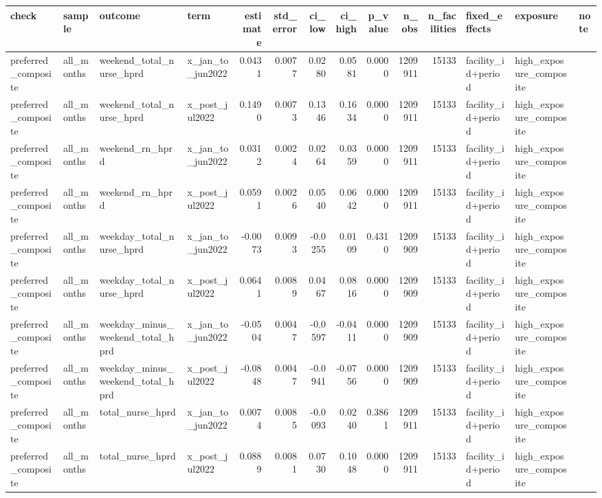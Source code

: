 \begin{tabular}{llllrrrrrrrlll}
\toprule
check & sample & outcome & term & estimate & std_error & ci_low & ci_high & p_value & n_obs & n_facilities & fixed_effects & exposure & note \\
\midrule
preferred_composite & all_months & weekend_total_nurse_hprd & x_jan_to_jun2022 & 0.0431 & 0.0077 & 0.0280 & 0.0581 & 0.0000 & 1209911 & 15133 & facility_id+period & high_exposure_composite &  \\
preferred_composite & all_months & weekend_total_nurse_hprd & x_post_jul2022 & 0.1490 & 0.0073 & 0.1346 & 0.1634 & 0.0000 & 1209911 & 15133 & facility_id+period & high_exposure_composite &  \\
preferred_composite & all_months & weekend_rn_hprd & x_jan_to_jun2022 & 0.0312 & 0.0024 & 0.0264 & 0.0359 & 0.0000 & 1209911 & 15133 & facility_id+period & high_exposure_composite &  \\
preferred_composite & all_months & weekend_rn_hprd & x_post_jul2022 & 0.0591 & 0.0026 & 0.0540 & 0.0642 & 0.0000 & 1209911 & 15133 & facility_id+period & high_exposure_composite &  \\
preferred_composite & all_months & weekday_total_nurse_hprd & x_jan_to_jun2022 & -0.0073 & 0.0093 & -0.0255 & 0.0109 & 0.4310 & 1209909 & 15133 & facility_id+period & high_exposure_composite &  \\
preferred_composite & all_months & weekday_total_nurse_hprd & x_post_jul2022 & 0.0641 & 0.0089 & 0.0467 & 0.0816 & 0.0000 & 1209909 & 15133 & facility_id+period & high_exposure_composite &  \\
preferred_composite & all_months & weekday_minus_weekend_total_hprd & x_jan_to_jun2022 & -0.0504 & 0.0047 & -0.0597 & -0.0411 & 0.0000 & 1209909 & 15133 & facility_id+period & high_exposure_composite &  \\
preferred_composite & all_months & weekday_minus_weekend_total_hprd & x_post_jul2022 & -0.0848 & 0.0047 & -0.0941 & -0.0756 & 0.0000 & 1209909 & 15133 & facility_id+period & high_exposure_composite &  \\
preferred_composite & all_months & total_nurse_hprd & x_jan_to_jun2022 & 0.0074 & 0.0085 & -0.0093 & 0.0240 & 0.3861 & 1209911 & 15133 & facility_id+period & high_exposure_composite &  \\
preferred_composite & all_months & total_nurse_hprd & x_post_jul2022 & 0.0889 & 0.0081 & 0.0730 & 0.1048 & 0.0000 & 1209911 & 15133 & facility_id+period & high_exposure_composite &  \\

\end{tabular}
